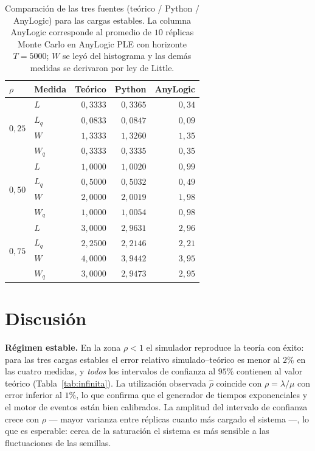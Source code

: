 \documentclass[11pt]{article}
\begin{document}
\begin{table}[H]
\centering
\small
\begin{tabular}{llrrr}
\toprule
\textbf{$\rho$} & \textbf{Medida} & \textbf{Te\'orico}
& \textbf{Python} & \textbf{AnyLogic} \\
\midrule
\multirow{4}{*}{$0{,}25$}
 & $L$   & $0{,}3333$ & $0{,}3365$ & $0{,}34$ \\
 & $L_q$ & $0{,}0833$ & $0{,}0847$ & $0{,}09$ \\
 & $W$   & $1{,}3333$ & $1{,}3260$ & $1{,}35$ \\
 & $W_q$ & $0{,}3333$ & $0{,}3335$ & $0{,}35$ \\
\midrule
\multirow{4}{*}{$0{,}50$}
 & $L$   & $1{,}0000$ & $1{,}0020$ & $0{,}99$ \\
 & $L_q$ & $0{,}5000$ & $0{,}5032$ & $0{,}49$ \\
 & $W$   & $2{,}0000$ & $2{,}0019$ & $1{,}98$ \\
 & $W_q$ & $1{,}0000$ & $1{,}0054$ & $0{,}98$ \\
\midrule
\multirow{4}{*}{$0{,}75$}
 & $L$   & $3{,}0000$ & $2{,}9631$ & $2{,}96$ \\
 & $L_q$ & $2{,}2500$ & $2{,}2146$ & $2{,}21$ \\
 & $W$   & $4{,}0000$ & $3{,}9442$ & $3{,}95$ \\
 & $W_q$ & $3{,}0000$ & $2{,}9473$ & $2{,}95$ \\
\bottomrule
\end{tabular}
\caption{Comparaci\'on de las tres fuentes (te\'orico / Python / AnyLogic)
para las cargas estables. La columna AnyLogic corresponde al promedio de $10$
r\'eplicas Monte Carlo en AnyLogic PLE con horizonte $T = 5000$; $W$ se
ley\'o del histograma y las dem\'as medidas se derivaron por ley de Little.}
\label{tab:fuentes}
\end{table}

\section{Discusi\'on}

\textbf{R\'egimen estable.} En la zona $\rho < 1$ el simulador reproduce la
teor\'ia con \'exito: para las tres cargas estables el error relativo
simulado--te\'orico es menor al $2\%$ en las cuatro medidas, y \emph{todos}
los intervalos de confianza al $95\%$ contienen al valor te\'orico
(Tabla~\ref{tab:infinita}). La utilizaci\'on observada $\hat{\rho}$ coincide
con $\rho = \lambda/\mu$ con error inferior al $1\%$, lo que confirma que el
generador de tiempos exponenciales y el motor de eventos est\'an bien
calibrados. La amplitud del intervalo de confianza crece con $\rho$ ---
mayor varianza entre r\'eplicas cuanto m\'as cargado el sistema ---, lo que es
esperable: cerca de la saturaci\'on el sistema es m\'as sensible a las
fluctuaciones de las semillas.
\end{document}
